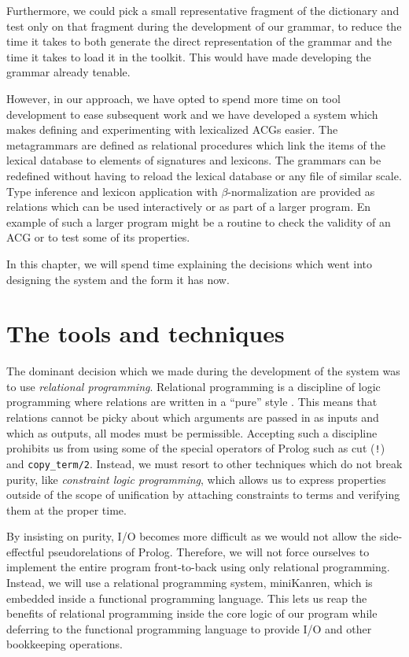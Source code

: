 Furthermore, we could pick a small representative fragment of the
dictionary and test only on that fragment during the development of our
grammar, to reduce the time it takes to both generate the direct
representation of the grammar and the time it takes to load it in the
toolkit. This would have made developing the grammar already
tenable.

However, in our approach, we have opted to spend more time on tool
development to ease subsequent work and we have developed a system which
makes defining and experimenting with lexicalized ACGs easier. The
metagrammars are defined as relational procedures which link the items
of the lexical database to elements of signatures and lexicons. The
grammars can be redefined without having to reload the lexical database
or any file of similar scale. Type inference and lexicon application
with $\beta$-normalization are provided as relations which can be used
interactively or as part of a larger program. En example of such a
larger program might be a routine to check the validity of an ACG or to
test some of its properties.

In this chapter, we will spend time explaining the decisions which went
into designing the system and the form it has now.

\section{The tools and techniques}

The dominant decision which we made during the development of the system
was to use \emph{relational programming}. Relational programming is a
discipline of logic programming where relations are written in a
``pure'' style \cite{byrd2010relational}. This means that relations
cannot be picky about which arguments are passed in as inputs and which
as outputs, all modes must be permissible. Accepting such a discipline
prohibits us from using some of the special operators of Prolog such as
cut (\texttt{!}) and \texttt{copy\_term/2}. Instead, we must resort to
other techniques which do not break purity, like \emph{constraint logic
  programming}, which allows us to express properties outside of the
scope of unification by attaching constraints to terms and verifying
them at the proper time.

By insisting on purity, I/O becomes more difficult as we would not allow
the side-effectful pseudorelations of Prolog. Therefore, we will not
force ourselves to implement the entire program front-to-back using only
relational programming. Instead, we will use a relational programming
system, miniKanren, which is embedded inside a functional programming
language. This lets us reap the benefits of relational programming
inside the core logic of our program while deferring to the functional
programming language to provide I/O and other bookkeeping operations.

